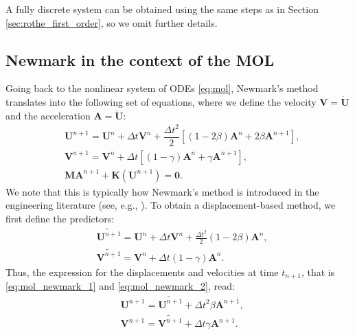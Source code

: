 \documentclass{sfuthesis}
\numberwithin{equation}{section}
\numberwithin{figure}{chapter}
\numberwithin{table}{chapter}
\theoremstyle{definition}
\def\*#1{{\mathbf{#1}}} %
\begin{document}
A fully discrete system can be obtained using the same steps as in Section \ref{sec:rothe_first_order}, so we omit further details.

\subsection{Newmark in the context of the MOL} \label{sec:mol_newmark}

Going back to the nonlinear system of ODEs \eqref{eq:mol}, Newmark's method translates into the following set of equations, where we define the velocity $\*V = \dot{\*U}$ and the acceleration $\*A = \ddot{\*U}$:
\vspace*{-1.2em}
\begin{subequations} \label{eq:mol_newmark}
    \begin{align}
        \label{eq:mol_newmark_1}&\*U^{n+1} = \*U^n + \Delta t \*V^n + \dfrac{\Delta t^2}{2} \left[ (1-2\beta) \*A^n + 2\beta \*A^{n+1} \right], \\
	    \label{eq:mol_newmark_2}&\*V^{n+1} = \*V^n + \Delta t \left[ (1-\gamma) \*A^n + \gamma \*A^{n+1} \right], \\
	    \label{eq:mol_newmark_3}&\*M \*A^{n+1} + \*K(\*U^{n+1}) = \*0.
    \end{align}
\end{subequations}
We note that this is typically how Newmark's method is introduced in the engineering literature (see, e.g., \cite{HughesBook}). To obtain a displacement-based method, we first define the predictors:
\vspace*{-1.2em}
\begin{subequations}
    \begin{align}
        \label{eq:pred_u}&\widetilde{\*U^{n+1}} = \*U^n + \Delta t \*V^n + \frac{\Delta t^2}{2} (1-2\beta) \*A^n, \\
        \label{eq:pred_v}&\widetilde{\*V^{n+1}} = \*V^n + \Delta t (1-\gamma) \*A^n.
    \end{align}
\end{subequations}
Thus, the expression for the displacements and velocities at time $t_{n+1}$, that is \eqref{eq:mol_newmark_1} and \eqref{eq:mol_newmark_2}, read:
\begin{subequations}
    \begin{align}
        &\*U^{n+1} = \widetilde{\*U^{n+1}} + \Delta t^2 \beta \*A^{n+1}, \\
        &\*V^{n+1} = \widetilde{\*V^{n+1}} + \Delta t \gamma \*A^{n+1}.
    \end{align}
\end{subequations}
\end{document}
